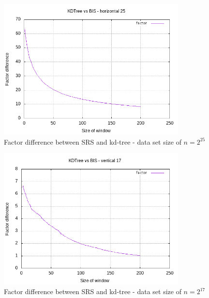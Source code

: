 \begin{figure}[h]
    \centering
    \includegraphics[width = 0.85\textwidth]{pictures/analysis/smalls/hori_fac_25.png}
    \caption{Factor difference between SRS and kd-tree - data set size of $n=2^{25}$}\label{fig:small_hori_fac_25}
\end{figure}
\clearpage

\begin{figure}[h]
    \centering
    \includegraphics[width = 0.85\textwidth]{pictures/analysis/smalls/vert_fac_17.png}
    \caption{Factor difference between SRS and kd-tree - data set size of $n=2^{17}$}\label{fig:small_vert_fac_17}
\end{figure}

